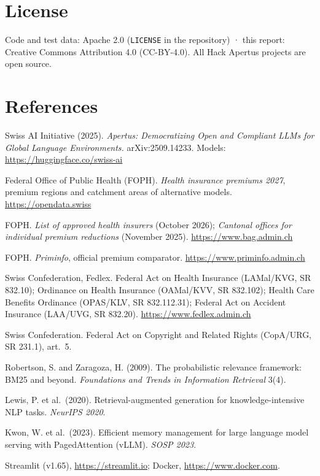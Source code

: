 \documentclass[10pt,a4paper]{article}
\begin{document}
\section*{License}
Code and test data: Apache 2.0 (\texttt{LICENSE} in the repository) · this report: Creative Commons Attribution 4.0
(CC-BY-4.0). All Hack Apertus projects are open source.

\section*{References}
{\small
\begin{enumerate}[label={[\arabic*]},leftmargin=2.1em]
\item Swiss AI Initiative (2025). \emph{Apertus: Democratizing Open and Compliant LLMs for Global Language
  Environments.} arXiv:2509.14233. Models: \url{https://huggingface.co/swiss-ai}
\item Federal Office of Public Health (FOPH). \emph{Health insurance premiums 2027}, premium regions and catchment
  areas of alternative models. \url{https://opendata.swiss}
\item FOPH. \emph{List of approved health insurers} (October 2026); \emph{Cantonal offices for individual premium
  reductions} (November 2025). \url{https://www.bag.admin.ch}
\item FOPH. \emph{Priminfo}, official premium comparator. \url{https://www.priminfo.admin.ch}
\item Swiss Confederation, Fedlex. Federal Act on Health Insurance (LAMal/KVG, SR 832.10); Ordinance on Health
  Insurance (OAMal/KVV, SR 832.102); Health Care Benefits Ordinance (OPAS/KLV, SR 832.112.31); Federal Act on Accident
  Insurance (LAA/UVG, SR 832.20). \url{https://www.fedlex.admin.ch}
\item Swiss Confederation. Federal Act on Copyright and Related Rights (CopA/URG, SR 231.1), art.~5.
\item Robertson, S. and Zaragoza, H. (2009). The probabilistic relevance framework: BM25 and beyond.
  \emph{Foundations and Trends in Information Retrieval} 3(4).
\item Lewis, P. et al.\ (2020). Retrieval-augmented generation for knowledge-intensive NLP tasks. \emph{NeurIPS 2020}.
\item Kwon, W. et al.\ (2023). Efficient memory management for large language model serving with PagedAttention
  (vLLM). \emph{SOSP 2023}.
\item Streamlit (v1.65), \url{https://streamlit.io}; Docker, \url{https://www.docker.com}.
\end{enumerate}}
\end{document}
